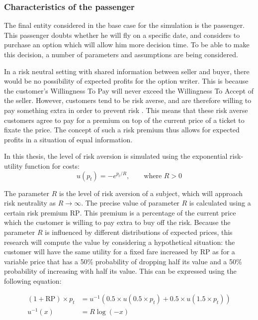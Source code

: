 \subsubsection{Characteristics of the passenger}
The final entity considered in the base case for the simulation is the passenger. This passenger doubts whether he will fly on a specific date, and considers to purchase an option which will allow him more decision time. To be able to make this decision, a number of parameters and assumptions are being considered.

In a risk neutral setting with shared information between seller and buyer, there would be no possibility of expected profits for the option writer. This is because the customer's Willingness To Pay will never exceed the Willingness To Accept of the seller. However, customers tend to be risk averse, and are therefore willing to pay something extra in order to prevent risk . This means that these risk averse customers agree to pay for a premium on top of the current price of a ticket to fixate the price. The concept of such a risk premium thus allows for expected profits in a situation of equal information.

In this thesis, the level of risk aversion is simulated using the exponential risk-utility function for costs:
$$
u(p_t) = -e^{p_t/R},\hspace{2em}\text{where } R > 0
$$

The parameter $R$ is the level of risk aversion of a subject, which will approach risk neutrality as $R \rightarrow \infty$. The precise value of parameter $R$ is calculated using a certain risk premium $\mbox{RP}$. This premium is a percentage of the current price which the customer is willing to pay extra to buy off the risk. Because the parameter $R$ is influenced by different distributions of expected prices, this research will compute the value by considering a hypothetical situation: the customer will have the same utility for a fixed fare increased by $\mbox{RP}$ as for a variable price that has a 50\% probability of dropping half its value and a 50\% probability of increasing with half its value. This can be expressed using the following equation: 

\begin{align*}
    (1 + \mbox{RP}) \times p_t &= u^{-1}(0.5 \times u(0.5 \times p_t) + 0.5 \times u(1.5 \times p_t)) \\
    u^{-1}(x) &= R \log(-x)
\end{align*}

